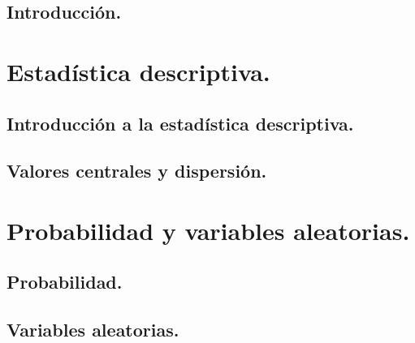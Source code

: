\documentclass[10pt,a4paper]{book}
\begin{document}
\setcounter{tocdepth}{1}
\tableofcontents

\chapter*{Introducción.}



\pagestyle{empty}
\newpage


\mainmatter

\part{Estadística descriptiva.}
\label{parte:EstadisticaDescriptiva}

\pagestyle{plain}



\chapter{Introducción a la estadística descriptiva.}
\label{cap:IntroduccionEstadisticaDescriptiva}


\chapter{Valores centrales y dispersión.}
\label{cap:ValoresCentralesDispersion}


\part{Probabilidad y variables aleatorias.}
\label{parte:ProbabilidadVariablesAleatorias}


\chapter{Probabilidad.}
\label{cap:Probabilidad}


\chapter{Variables aleatorias.}
\label{cap:VariablesAleatorias}

\end{document}

